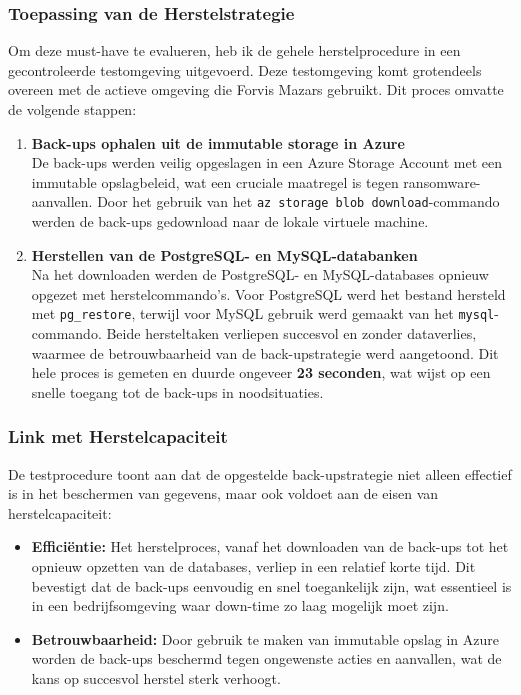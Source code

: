 \subsubsection{Toepassing van de Herstelstrategie}
Om deze must-have te evalueren, heb ik de gehele herstelprocedure in een gecontroleerde testomgeving uitgevoerd. Deze testomgeving komt grotendeels overeen met de actieve omgeving die Forvis Mazars gebruikt. Dit proces omvatte de volgende stappen:

\begin{enumerate}
    \item \textbf{Back-ups ophalen uit de immutable storage in Azure} \\
    De back-ups werden veilig opgeslagen in een Azure Storage Account met een immutable opslagbeleid, wat een cruciale maatregel is tegen ransomware-aanvallen. Door het gebruik van het \texttt{az storage blob download}-commando werden de back-ups gedownload naar de lokale virtuele machine.
    
    \item \textbf{Herstellen van de PostgreSQL- en MySQL-databanken} \\
    Na het downloaden werden de PostgreSQL- en MySQL-databases opnieuw opgezet met herstelcommando’s. Voor PostgreSQL werd het bestand hersteld met \texttt{pg\_restore}, terwijl voor MySQL gebruik werd gemaakt van het \texttt{mysql}-commando. Beide hersteltaken verliepen succesvol en zonder dataverlies, waarmee de betrouwbaarheid van de back-upstrategie werd aangetoond. Dit hele proces is gemeten en duurde ongeveer \textbf{23 seconden}, wat wijst op een snelle toegang tot de back-ups in noodsituaties.
\end{enumerate}

\subsubsection{Link met Herstelcapaciteit}
De testprocedure toont aan dat de opgestelde back-upstrategie niet alleen effectief is in het beschermen van gegevens, maar ook voldoet aan de eisen van herstelcapaciteit:

\begin{itemize}
    \item \textbf{Efficiëntie:} Het herstelproces, vanaf het downloaden van de back-ups tot het opnieuw opzetten van de databases, verliep in een relatief korte tijd. Dit bevestigt dat de back-ups eenvoudig en snel toegankelijk zijn, wat essentieel is in een bedrijfsomgeving waar down-time zo laag mogelijk moet zijn.
    
    \item \textbf{Betrouwbaarheid:} Door gebruik te maken van immutable opslag in Azure worden de back-ups beschermd tegen ongewenste acties en aanvallen, wat de kans op succesvol herstel sterk verhoogt.
\end{itemize}

